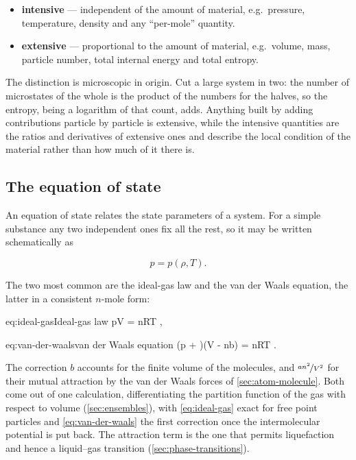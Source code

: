         \begin{itemize}
            \item \textbf{intensive} --- independent of the amount of material, e.g.\ pressure, temperature, density and any \enquote{per-mole} quantity.
            \item \textbf{extensive} --- proportional to the amount of material, e.g.\ volume, mass, particle number, total internal energy and total entropy.
        \end{itemize}

        The distinction is microscopic in origin. Cut a large system in two: the number of microstates of the whole is the product of the numbers for the halves, so the entropy, being a logarithm of that count, adds. Anything built by adding contributions particle by particle is extensive, while the intensive quantities are the ratios and derivatives of extensive ones and describe the local condition of the material rather than how much of it there is.

    \subsection{The equation of state}

        An equation of state relates the state parameters of a system. For a simple substance any two independent ones fix all the rest, so it may be written schematically as

        \begin{equation*}
            p = p\left(\rho,T\right).
        \end{equation*}

        The two most common are the ideal-gas law and the van der Waals equation, the latter in a consistent $n$-mole form:

        \begin{keyeq}{eq:ideal-gas}{Ideal-gas law}
            pV = nRT ,
        \end{keyeq}

        \begin{keyeq}{eq:van-der-waals}{van der Waals equation}
            \left(p + \right)\left(V - nb\right) = nRT .
        \end{keyeq}

        The correction $b$ accounts for the finite volume of the molecules, and $\nicefrac{an^{2}}{V^{2}}$ for their mutual attraction by the van der Waals forces of \cref{sec:atom-molecule}. Both come out of one calculation, differentiating the partition function of the gas with respect to volume (\cref{sec:ensembles}), with \cref{eq:ideal-gas} exact for free point particles and \cref{eq:van-der-waals} the first correction once the intermolecular potential is put back. The attraction term is the one that permits liquefaction and hence a liquid--gas transition (\cref{sec:phase-transitions}).

